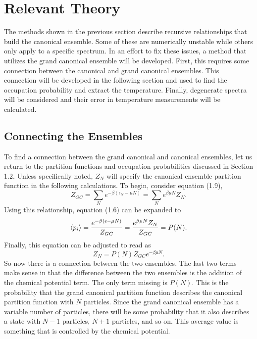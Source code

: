 \chapter{Relevant Theory} \label{ch:ns-equations}
\begin{em}
The methods shown in the previous section describe recursive relationships that build the canonical ensemble. Some of these are numerically unstable while others only apply to a specific spectrum. In an effort to fix these issues, a method that utilizes the grand canonical ensemble will be developed. First, this requires some connection between the canonical and grand canonical ensembles. This connection will be developed in the following section and used to find the occupation probability and extract the temperature. Finally, degenerate spectra will be considered and their error in temperature measurements will be calculated.  
\end{em}
\section{Connecting the Ensembles}
To find a connection between the grand canonical and canonical ensembles, let us return to the partition functions and occupation probabilities discussed in Section 1.2. Unless specifically noted, $Z_N$ will specify the canonical ensemble partition function in the following calculations. To begin, consider equation (1.9), 
\begin{equation}
    Z_{GC}=\sum_N e^{-\beta(\epsilon_N-\mu N)}=\sum_N e^{\beta\mu N} Z_{N}.
\end{equation}
Using this relationship, equation (1.6) can be expanded to 
\begin{equation}
    \left<{p_i}\right>=\frac{e^{-\beta(\epsilon-\mu N)}}{Z_{GC}} =\frac{e^{\beta\mu N} Z_N}{Z_{GC}}=P(N).
\end{equation}
Finally, this equation can be adjusted to read as
\begin{equation}
    Z_N=P(N) Z_{GC} e^{-\beta\mu N}.
\end{equation}
So now there is a connection between the two ensembles. The last two terms make sense in that the difference between the two ensembles is the addition of the chemical potential term. The only term missing is $P(N)$. This is the probability that the grand canonical partition function describes the canonical partition function with $N$ particles. Since the grand canonical ensemble has a variable number of particles, there will be some probability that it also describes a state with $N-1$ particles, $N+1$ particles, and so on. This average value is something that is controlled by the chemical potential. 



